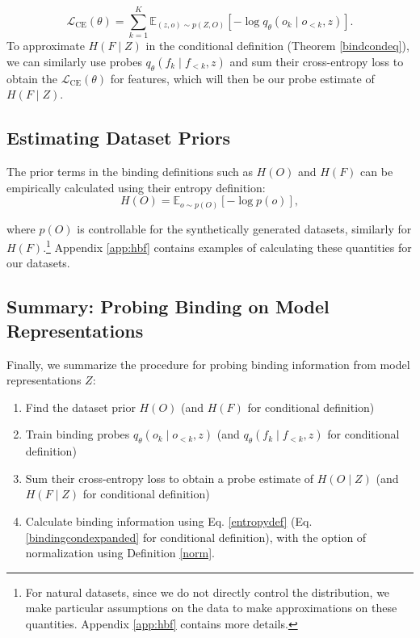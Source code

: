 \documentclass{article}
\theoremstyle{plain}
\theoremstyle{definition}
\theoremstyle{remark}
\begin{document}
\begin{equation}
\mathcal{L}_{\text{CE}}(\theta)
=
\sum_{k=1}^K
\mathbb E_{(z,o)\sim p(Z,O)}
\left[
-\log q_{\theta}(o_k\mid o_{<k},z)
\right].
\label{sumloss}
\end{equation}
To approximate $H(F\mid Z)$ in the conditional definition (Theorem \ref{bindcondeq}), we can similarly use probes $q_\theta(f_k\mid f_{<k}, z)$ and sum their cross-entropy loss to obtain the $\mathcal{L}_{\text{CE}}(\theta)$ for features, which will then be our probe estimate of $H(F\mid Z)$.

\subsection{Estimating Dataset Priors}
\label{dataprior}
The prior terms in the binding definitions such as $H(O)$ and $H(F)$ can be empirically calculated using their entropy definition: 
\[H(O)=\mathbb{E}_{o\sim p(O)}\left[-\log p(o)\right],\]

where $p(O)$ is controllable for the synthetically generated datasets, similarly for $H(F)$.\footnote{For natural datasets, since we do not directly control the distribution, we make particular assumptions on the data to make approximations on these quantities. Appendix \ref{app:hbf} contains more details.}
Appendix \ref{app:hbf} contains examples of calculating these quantities for our datasets.


\subsection{Summary: Probing Binding on Model Representations}
\label{sumprobe}

Finally, we summarize the procedure for probing binding information from model representations $Z$:

\begin{enumerate}
    \item Find the dataset prior $H(O)$ (and $H(F)$ for conditional definition)
    \item Train binding probes $q_\theta (o_k\mid o_{<k}, z)$ (and $q_\theta (f_k\mid f_{<k}, z)$ for conditional definition)
    \item Sum their cross-entropy loss to obtain a probe estimate of $H(O\mid Z)$ (and $H(F\mid Z)$ for conditional definition)
    \item Calculate binding information using Eq. \eqref{entropydef} (Eq. \eqref{bindingcondexpanded} for conditional definition), with the option of normalization using Definition \ref{norm}.
\end{enumerate}
\end{document}
